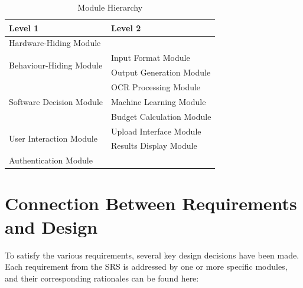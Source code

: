 \documentclass[12pt, titlepage]{article}
\begin{document}
\begin{table}[h!]
\caption{Module Hierarchy}
\centering
\begin{tabular}{p{} p{}}
\toprule
\textbf{Level 1} & \textbf{Level 2}\\
\midrule

{Hardware-Hiding Module} & ~ \\
\midrule

\multirow{2}{0.3\textwidth}{Behaviour-Hiding Module} & Input Format Module\\
& Output Generation Module\\
\midrule

\multirow{3}{0.3\textwidth}{Software Decision Module} & {OCR Processing Module}\\
& Machine Learning Module\\
& Budget Calculation Module\\
\midrule

\multirow{2}{0.3\textwidth}{User Interaction Module} & {Upload Interface Module}\\
& Results Display Module\\
\midrule

{Authentication Module} & ~ \\
\bottomrule

\end{tabular}
\label{TblMH}
\end{table}

\section{Connection Between Requirements and Design} \label{SecConnection}



To satisfy the various requirements, several key design decisions have been made. Each requirement from the SRS is addressed by one or more specific modules, and their corresponding rationales can be found here: \\
\end{document}
